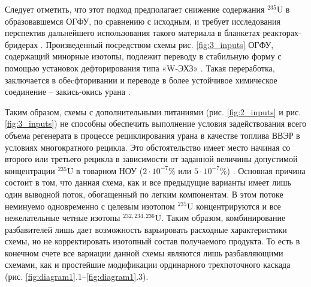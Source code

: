 Следует отметить, что этот подход предполагает снижение содержания $^{235}$U в образовавшемся ОГФУ, по сравнению с исходным, и требует исследования перспектив дальнейшего использования такого материала в бланкетах реакторах-бридерах \cite{smirnovApplyingEnrichmentCapacities2018}.
Произведенный посредством схемы рис. \ref{fig:3_inputs} ОГФУ, содержащий минорные изотопы, подлежит переводу в стабильную форму с помощью установок дефторирования типа «W-ЭХЗ» \cite{RosatomGoskorporaciyaRosatoma}. Такая переработка, заключается в обеcфторивании и переводе в более устойчивое химическое соединение -- закись-окись урана  \cite{PererabotkaOGFUObrazovaniem2014}.

Таким образом, схемы с дополнительными питаниями (рис. \ref{fig:2_inputs} и рис. \ref{fig:3_inputs}) не способны обеспечить выполнение условия задействования всего объема регенерата в процессе рециклирования урана в качестве топлива ВВЭР в условиях многократного рецикла. Это обстоятельство имеет место начиная со второго или третьего рецикла в зависимости от заданной величины допустимой концентрации $^{235}$U в товарном НОУ ($2\cdot10^{-7}$\% или $5\cdot10^{-7}$\%) \cite{smirnovEvolutionIsotopicComposition2012}. Основная причина состоит в том, что данная схема, как и все предыдущие варианты имеет лишь один выводной поток, обогащенный по легким компонентам. В этом потоке неминуемо одновременно с целевым изотопом  $^{235}$U концентрируются и все нежелательные четные изотопы $^{232,234,236}$U. Таким образом, комбинирование разбавителей лишь дает возможность варьировать расходные характеристики схемы, но не корректировать изотопный состав получаемого продукта. То есть в конечном счете все вариации данной схемы являются лишь разбавляющими схемами, как и простейшие модификации ординарного трехпоточного каскада (рис. \ref{fig:diagram1}.1--\ref{fig:diagram1}.3).



